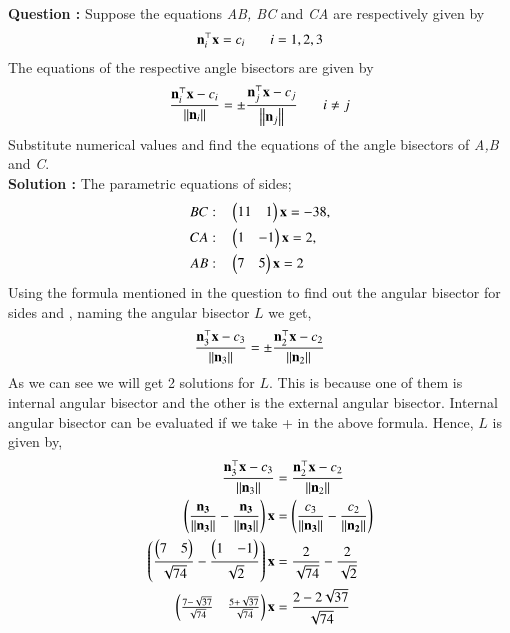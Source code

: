 \documentclass[journal,12pt,twocolumn]{IEEEtran}
\theoremstyle{remark}
\begin{document}
%

\textbf{Question :} Suppose the equations \textit{AB, BC} and \textit{CA} are respectively given by
		\begin{align}
			\vec{n}_{i}^{\top} \vec{x} = c_{i} \hspace{0.25in} i = 1,2,3
		\end{align}
		The equations of the respective angle bisectors are given by
		\begin{align}
			\frac{\vec{n}_{i}^{\top} \vec{x}-c_{i}}{\norm{\vec{n}_{i}}}=\pm\frac{\vec{n}_{j}^{\top} \vec{x}-c_{j}}{\norm{\vec{n}_{j}}} \hspace{0.25in}i\neq j 
		\end{align}
		Substitute numerical values and find the equations of the angle bisectors of \textit{A,B} and \textit{C}.\\
\textbf{Solution :}
	The parametric equations of sides;
	\begin{align}
	BC:\quad &\myvec{11&1}\vec{x}=-38,\\
	CA:\quad &\myvec{1&-1}\vec{x}=2,\\
	AB:\quad &\myvec{7&5}\vec{x}=2\\	  
	\end{align}
	Using the formula mentioned in the question to find out the angular bisector for sides  and , naming the angular bisector $L$ we get,
	\begin{align}
		\frac{\vec{n}_{3}^{\top} \vec{x}-c_{3}}{\norm{\vec{n}_{3}}}=\pm \frac{\vec{n}_{2}^{\top} \vec{x}-c_{2}}{\norm{\vec{n}_{2}}}
	\end{align}
	As we can see we will get 2 solutions for $L$. This is because one of them is internal angular bisector and the other is the external angular bisector. Internal angular bisector can be evaluated if we take + in the above formula.
	Hence, $L$ is given by,
	\begin{align}
		\frac{\vec{n}_{3}^{\top} \vec{x}-c_{3}}{\norm{\vec{n}_{3}}}&=\frac{\vec{n}_{2}^{\top} \vec{x}-c_{2}}{\norm{\vec{n}_{2}}}\\
		\brak{\frac{\vec{n_{3}}}{\norm{\vec{n_{3}}}}-\frac{\vec{n_{3}}}{\norm{\vec{n_{3}}}}} \vec{x}&=\brak{\frac{c_{3}}{\norm{\vec{n_{3}}}}-\frac{c_{2}}{\norm{\vec{n_{2}}}}}\\
		\brak{\frac{\myvec{7&5}}{\sqrt{74}}-\frac{\myvec{1&-1}}{\sqrt{2}}} \vec{x}&=\frac{2}{\sqrt{74}}-\frac{2}{\sqrt{2}}\\
		\myvec{\frac{7-\sqrt{37}}{\sqrt{74}}&\frac{5+\sqrt{37}}{\sqrt{74}}}\vec{x}&=\frac{2-2\sqrt{37}}{\sqrt{74}}
	\end{align}
\end{document}
